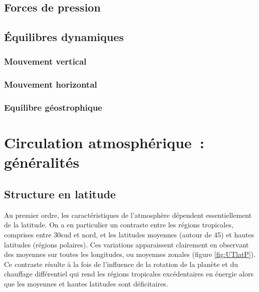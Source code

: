 \sk
\subsection{Forces de pression}
	

\sk
\subsection{Équilibres dynamiques}
	
	

\sk
\subsubsection{Mouvement vertical}
	

\sk
\subsubsection{Mouvement horizontal}
	

\sk
\subsubsection{Equilibre géostrophique}
	

\mk
\section{Circulation atmosphérique~: généralités}

\sk
\subsection{Structure en latitude}

\sk
Au premier ordre, les caractéristiques de l'atmosphère dépendent essentiellement de la latitude. On a en particulier un contraste entre les régions tropicales, comprises entre 30\deg sud et nord, et les latitudes moyennes (autour de 45\deg) et hautes latitudes (régions polaires). Ces variations apparaissent clairement en observant des moyennes sur toutes les longitudes, ou moyennes zonales (figure \ref{fig:UTlatP}). Ce contraste résulte à la fois de l'influence de la rotation de la planète et du chauffage différentiel qui rend les régions tropicales excédentaires en énergie alors que les moyennes et hautes latitudes sont déficitaires.

